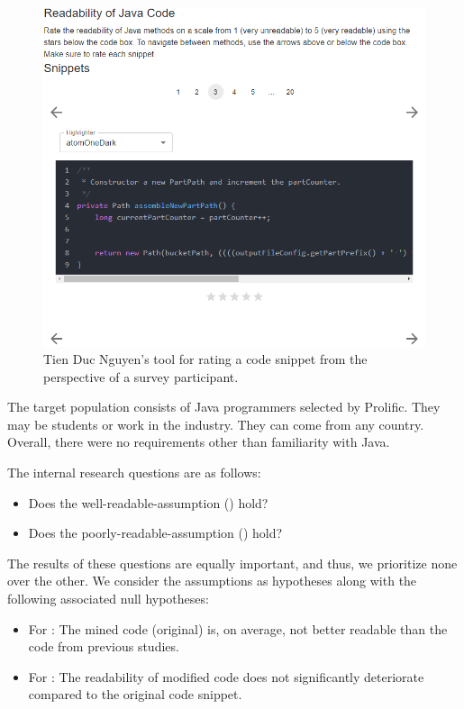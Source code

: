 \documentclass[%
class=scrreprt,
chapterprefix=false,%
open=right,%
twoside=true,%
paper=a4,%
logofile={Logo\_zentral\_farbig\_EN.png},%
thesistype=master,%
UKenglish,%
]{se2thesis}
\theoremstyle{definition}
\begin{document}
	\begin{figure}[tb]
		\centering
		\includegraphics[width=\textwidth]{img/survey_tool.png}
		\caption{Tien Duc Nguyen's tool for rating a code snippet from the perspective of a survey participant.}
		\label{fig:survey_tool}
	\end{figure}

	The target population consists of Java programmers selected by Prolific. They may be students or work in the industry. They can come from any country. Overall, there were no requirements other than familiarity with Java.
		
	The internal research questions are as follows:
    \begin{itemize}
        \item Does the well-readable-assumption () hold?
        \item Does the poorly-readable-assumption () hold?
    \end{itemize}
    
    The results of these questions are equally important, and thus, we prioritize none over the other.
    We consider the assumptions as hypotheses along with the following associated null hypotheses:
    \begin{itemize}
        \item For : The mined code (original) is, on average, not better readable than the code from previous studies.
        \item For : The readability of modified code does not significantly deteriorate compared to the original code snippet.
    \end{itemize}
    
\end{document}
